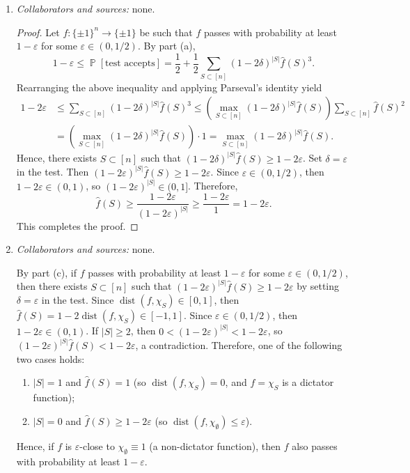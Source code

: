 \documentclass[letterpaper, reqno,11pt]{article}
\newcommand{\PP}{\mathop{{}\mathbb{P}}}
\DeclareMathOperator{\dist}{dist}
\begin{document}
\begin{enumerate}
\begin{enumerate}
    \clearpage

    \item \noindent\emph{Collaborators and sources:} none.
    
    \begin{proof}
      Let $f : \{ \pm 1 \}^n \to \{ \pm 1 \}$ be such that $f$ passes with probability at least $1 - \varepsilon$ for some $\varepsilon \in (0, 1/2)$. By part (a),
      $$ 1 - \varepsilon \leq \PP[\text{test accepts}] = \frac{1}{2} + \frac{1}{2} \sum_{S \subset [n]} (1 - 2\delta)^{|S|} \hat{f}(S)^3. $$
      Rearranging the above inequality and applying Parseval's identity yield
      \begin{align*}
        1 - 2\varepsilon &\leq \sum_{S \subset [n]} (1 - 2\delta)^{|S|} \hat{f}(S)^3 \leq \left(\max_{S \subset [n]} (1 - 2\delta)^{|S|} \hat{f}(S)\right) \sum_{S \subset [n]} \hat{f}(S)^2 \\
        &= \left(\max_{S \subset [n]} (1 - 2\delta)^{|S|} \hat{f}(S)\right) \cdot 1 = \max_{S \subset [n]} (1 - 2\delta)^{|S|} \hat{f}(S).
      \end{align*}
      Hence, there exists $S \subset [n]$ such that $(1 - 2\delta)^{|S|} \hat{f}(S) \geq 1 - 2\varepsilon$. Set $\delta = \varepsilon$ in the test. Then $(1 - 2\varepsilon)^{|S|} \hat{f}(S) \geq 1 - 2\varepsilon$. Since $\varepsilon \in (0, 1/2)$, then $1 - 2\varepsilon \in (0, 1)$, so $(1 - 2\varepsilon)^{|S|} \in (0, 1]$. Therefore,
      $$ \hat{f}(S) \geq \frac{1 - 2\varepsilon}{(1 - 2\varepsilon)^{|S|}} \geq \frac{1 - 2\varepsilon}{1} = 1 - 2\varepsilon. $$
      This completes the proof.
    \end{proof}

    \clearpage

    \item \noindent\emph{Collaborators and sources:} none.
    
    By part (c), if $f$ passes with probability at least $1 - \varepsilon$ for some $\varepsilon \in (0, 1/2)$, then there exists $S \subset [n]$ such that $(1 - 2\varepsilon)^{|S|} \hat{f}(S) \geq 1 - 2\varepsilon$ by setting $\delta = \varepsilon$ in the test. Since $\dist(f, \chi_S) \in [0, 1]$, then $\hat{f}(S) = 1 - 2\dist(f, \chi_S) \in [-1, 1]$. Since $\varepsilon \in (0, 1/2)$, then $1 - 2\varepsilon \in (0, 1)$. If $|S| \geq 2$, then $0 < (1 - 2\varepsilon)^{|S|} < 1 - 2\varepsilon$, so $(1 - 2\varepsilon)^{|S|} \hat{f}(S) < 1 - 2\varepsilon$, a contradiction. Therefore, one of the following two cases holds:
    \begin{enumerate}[label=(\roman*), itemsep=0pt]
      \item $|S| = 1$ and $\hat{f}(S) = 1$ (so $\dist(f, \chi_S) = 0$, and $f = \chi_S$ is a dictator function);
      \item $|S| = 0$ and $\hat{f}(S) \geq 1 - 2\varepsilon$ (so $\dist(f, \chi_\emptyset) \leq \varepsilon$).
    \end{enumerate}
    Hence, if $f$ is $\varepsilon$-close to $\chi_\emptyset \equiv 1$ (a non-dictator function), then $f$ also passes with probability at least $1 - \varepsilon$.


\end{enumerate}
\end{enumerate}
\end{document}

